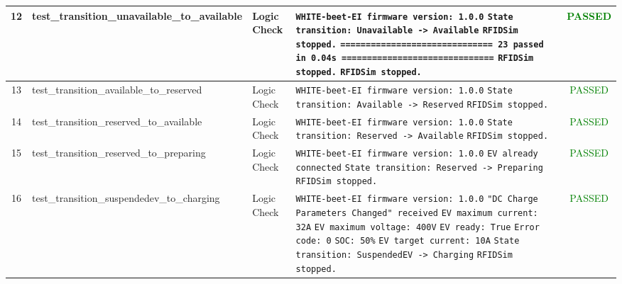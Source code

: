 \documentclass[10pt, a4paper, landscape]{article}
\begin{document}
\begin{longtable}{|c|p{6cm}|p{2.5cm}|p{8cm}|c|}
\hline
12 & test\_transition\_unavailable\_to\_available & Logic Check & \texttt{\scriptsize WHITE-beet-EI firmware version: 1.0.0} \newline \texttt{\scriptsize State transition: Unavailable -> Available} \newline \texttt{\scriptsize RFIDSim stopped.} \newline \texttt{\scriptsize ============================== 23 passed in 0.04s ==============================} \newline \texttt{\scriptsize RFIDSim stopped.} \newline \texttt{\scriptsize RFIDSim stopped.} & \textcolor{green}{PASSED} \\
\hline
13 & test\_transition\_available\_to\_reserved & Logic Check & \texttt{\scriptsize WHITE-beet-EI firmware version: 1.0.0} \newline \texttt{\scriptsize State transition: Available -> Reserved} \newline \texttt{\scriptsize RFIDSim stopped.} & \textcolor{green}{PASSED} \\
\hline
14 & test\_transition\_reserved\_to\_available & Logic Check & \texttt{\scriptsize WHITE-beet-EI firmware version: 1.0.0} \newline \texttt{\scriptsize State transition: Reserved -> Available} \newline \texttt{\scriptsize RFIDSim stopped.} & \textcolor{green}{PASSED} \\
\hline
15 & test\_transition\_reserved\_to\_preparing & Logic Check & \texttt{\scriptsize WHITE-beet-EI firmware version: 1.0.0} \newline \texttt{\scriptsize EV already connected} \newline \texttt{\scriptsize State transition: Reserved -> Preparing} \newline \texttt{\scriptsize RFIDSim stopped.} & \textcolor{green}{PASSED} \\
\hline
16 & test\_transition\_suspendedev\_to\_charging & Logic Check & \texttt{\scriptsize WHITE-beet-EI firmware version: 1.0.0} \newline \texttt{\scriptsize "DC Charge Parameters Changed" received} \newline \texttt{\scriptsize EV maximum current: 32A} \newline \texttt{\scriptsize EV maximum voltage: 400V} \newline \texttt{\scriptsize EV ready: True} \newline \texttt{\scriptsize Error code: 0} \newline \texttt{\scriptsize SOC: 50\%} \newline \texttt{\scriptsize EV target current: 10A} \newline \texttt{\scriptsize State transition: SuspendedEV -> Charging} \newline \texttt{\scriptsize RFIDSim stopped.} & \textcolor{green}{PASSED} \\

\end{longtable}
\end{document}
